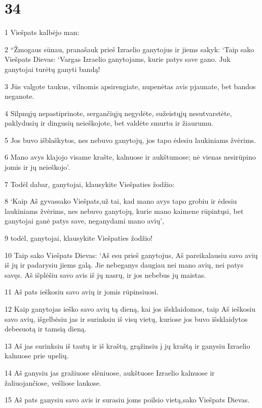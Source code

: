 \chapter{34}


\par 1 Viešpats kalbėjo man: 
\par 2 “Žmogaus sūnau, pranašauk prieš Izraelio ganytojus ir jiems sakyk: ‘Taip sako Viešpats Dievas: ‘Vargas Izraelio ganytojams, kurie patys save gano. Juk ganytojai turėtų ganyti bandą! 
\par 3 Jūs valgote taukus, vilnomis apsirengiate, nupenėtas avis pjaunate, bet bandos neganote. 
\par 4 Silpnųjų nepastiprinote, sergančiųjų negydėte, sužeistųjų nesutvarstėte, paklydusių ir dingusių neieškojote, bet valdėte smurtu ir žiaurumu. 
\par 5 Jos buvo išblaškytos, nes nebuvo ganytojų, jos tapo ėdesiu laukiniams žvėrims. 
\par 6 Mano avys klajojo visame krašte, kalnuose ir aukštumose; nė vienas nesirūpino jomis ir jų neieškojo’. 
\par 7 Todėl dabar, ganytojai, klausykite Viešpaties žodžio: 
\par 8 ‘Kaip Aš gyvas­sako Viešpats,­už tai, kad mano avys tapo grobiu ir ėdesiu laukiniams žvėrims, nes nebuvo ganytojų, kurie mano kaimene rūpintųsi, bet ganytojai ganė patys save, neganydami mano avių’,­ 
\par 9 todėl, ganytojai, klausykite Viešpaties žodžio! 
\par 10 Taip sako Viešpats Dievas: ‘Aš esu prieš ganytojus, Aš pareikalausiu savo avių iš jų ir padarysiu jiems galą. Jie nebeganys daugiau nei mano avių, nei patys savęs. Aš išplėšiu savo avis iš jų nasrų, ir jos nebebus jų maistas. 
\par 11 Aš pats ieškosiu savo avių ir jomis rūpinsiuosi. 
\par 12 Kaip ganytojas ieško savo avių tą dieną, kai jos išsklaidomos, taip Aš ieškosiu savo avių, išgelbėsiu jas ir surinksiu iš visų vietų, kuriose jos buvo išsklaidytos debesuotą ir tamsią dieną. 
\par 13 Aš jas surinksiu iš tautų ir iš kraštų, grąžinsiu į jų kraštą ir ganysiu Izraelio kalnuose prie upelių. 
\par 14 Aš ganysiu jas gražiuose slėniuose, aukštuose Izraelio kalnuose ir žaliuojančiose, vešliose lankose. 
\par 15 Aš pats ganysiu savo avis ir surasiu joms poilsio vietą,­sako Viešpats Dievas.­ 
